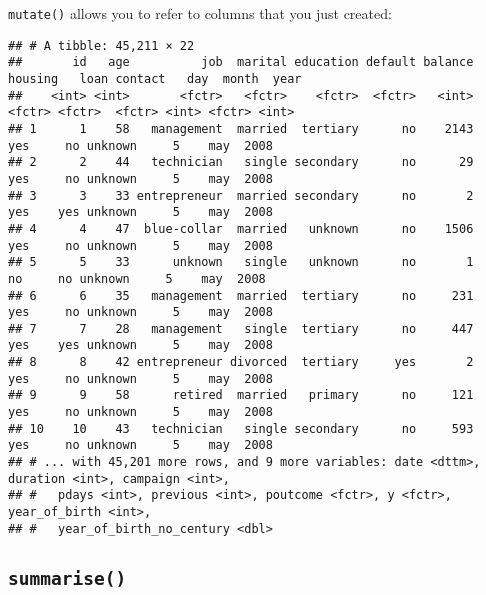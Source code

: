 \documentclass[]{book}
\newenvironment{Shaded}{\begin{snugshade}}{\end{snugshade}}
\newcommand{\KeywordTok}[1]{\textcolor[rgb]{0.13,0.29,0.53}{\textbf{{#1}}}}
\newcommand{\DataTypeTok}[1]{\textcolor[rgb]{0.13,0.29,0.53}{{#1}}}
\newcommand{\DecValTok}[1]{\textcolor[rgb]{0.00,0.00,0.81}{{#1}}}
\newcommand{\StringTok}[1]{\textcolor[rgb]{0.31,0.60,0.02}{{#1}}}
\newcommand{\CommentTok}[1]{\textcolor[rgb]{0.56,0.35,0.01}{\textit{{#1}}}}
\newcommand{\NormalTok}[1]{{#1}}
\begin{document}
\texttt{mutate()} allows you to refer to columns that you just created:

\begin{Shaded}
\end{Shaded}

\begin{verbatim}
## # A tibble: 45,211 × 22
##       id   age          job  marital education default balance housing   loan contact   day  month  year
##    <int> <int>       <fctr>   <fctr>    <fctr>  <fctr>   <int>  <fctr> <fctr>  <fctr> <int> <fctr> <int>
## 1      1    58   management  married  tertiary      no    2143     yes     no unknown     5    may  2008
## 2      2    44   technician   single secondary      no      29     yes     no unknown     5    may  2008
## 3      3    33 entrepreneur  married secondary      no       2     yes    yes unknown     5    may  2008
## 4      4    47  blue-collar  married   unknown      no    1506     yes     no unknown     5    may  2008
## 5      5    33      unknown   single   unknown      no       1      no     no unknown     5    may  2008
## 6      6    35   management  married  tertiary      no     231     yes     no unknown     5    may  2008
## 7      7    28   management   single  tertiary      no     447     yes    yes unknown     5    may  2008
## 8      8    42 entrepreneur divorced  tertiary     yes       2     yes     no unknown     5    may  2008
## 9      9    58      retired  married   primary      no     121     yes     no unknown     5    may  2008
## 10    10    43   technician   single secondary      no     593     yes     no unknown     5    may  2008
## # ... with 45,201 more rows, and 9 more variables: date <dttm>, duration <int>, campaign <int>,
## #   pdays <int>, previous <int>, poutcome <fctr>, y <fctr>, year_of_birth <int>,
## #   year_of_birth_no_century <dbl>
\end{verbatim}

\clearpage

\subsection{\texorpdfstring{\texttt{summarise()}}{summarise()}}\label{summarise}
\end{document}
